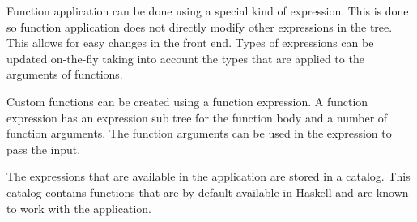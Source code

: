 Function application can be done using a special kind of expression.
This is done so function application does not directly modify other expressions in the tree.
This allows for easy changes in the front end.
Types of expressions can be updated on-the-fly taking into account the types that are applied to the arguments of functions.

Custom functions can be created using a function expression.
A function expression has an expression sub tree for the function body and a number of function arguments.
The function arguments can be used in the expression to pass the input.

The expressions that are available in the application are stored in a catalog. This catalog contains functions that are
by default available in Haskell and are known to work with the application.
